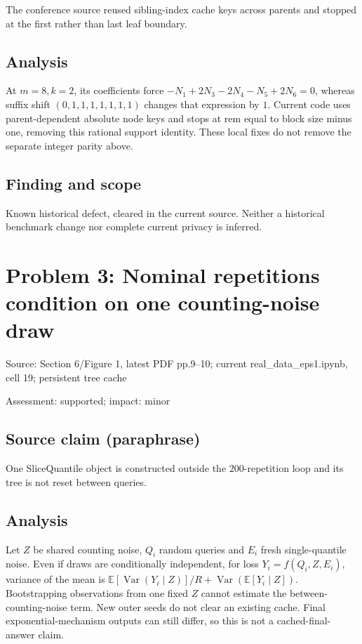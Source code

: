 \documentclass[11pt]{article}
\begin{document}
The conference source reused sibling-index cache keys across parents and stopped at the first rather than last leaf boundary.

\subsection*{Analysis}

At \(m=8,k=2\), its coefficients force \(-N_1+2N_3-2N_4-N_5+2N_6=0\), whereas suffix shift \((0,1,1,1,1,1,1,1)\) changes that expression by \(1\). Current code uses parent-dependent absolute node keys and stops at rem equal to block size minus one, removing this rational support identity. These local fixes do not remove the separate integer parity above.

\subsection*{Finding and scope}

Known historical defect, cleared in the current source. Neither a historical benchmark change nor complete current privacy is inferred.

\section*{Problem 3: Nominal repetitions condition on one counting-noise draw}

Source: Section 6/Figure 1, latest PDF pp.9–10; current real\_data\_eps1.ipynb, cell 19; persistent tree cache

Assessment: supported; impact: minor

\subsection*{Source claim (paraphrase)}

One SliceQuantile object is constructed outside the \(200\)-repetition loop and its tree is not reset between queries.

\subsection*{Analysis}

Let \(Z\) be shared counting noise, \(Q_i\) random queries and \(E_i\) fresh single-quantile noise. Even if draws are conditionally independent, for loss \(Y_i=f(Q_i,Z,E_i)\), variance of the mean is \(\mathbb E[\operatorname{Var}(Y_i\mid Z)]/R+\operatorname{Var}(\mathbb E[Y_i\mid Z])\). Bootstrapping observations from one fixed \(Z\) cannot estimate the between-counting-noise term. New outer seeds do not clear an existing cache. Final exponential-mechanism outputs can still differ, so this is not a cached-final-answer claim.
\end{document}
